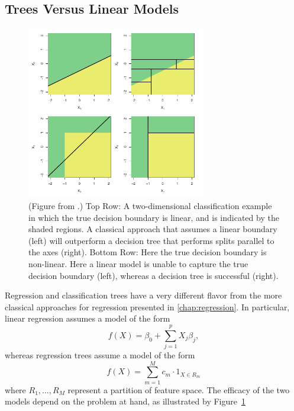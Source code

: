 \subsection{Trees Versus Linear Models} %
\label{sub:trees_versus_linear_models}
\begin{figure}[h!tb]
    \begin{center}
        \includegraphics[width=0.7\textwidth]{figures/decision_tree_linear_model}
    \end{center}
    \caption{(Figure from \cite{james2013statisticallearning}.)
Top Row: A two-dimensional classification example in which the true decision
boundary is linear, and is indicated by the shaded regions. A classical approach
that assumes a linear boundary (left) will outperform a decision tree that
performs splits parallel to the axes (right). Bottom Row: Here the true decision
boundary is non-linear. Here a linear model is unable to capture the true
decision boundary (left), whereas a decision tree is successful (right).}
    \label{fig:decision_trees_linear_models}
\end{figure}

Regression and classification trees have a very different flavor from the more
classical approaches for regression presented in \ref{chap:regression}.
In particular, linear regression assumes a model of the form
$$
        f(X) = \beta_0 + \sum_{j=1}^{p} X_j \beta_j,
$$
whereas regression trees assume a model of the form
$$
        f(X) = \sum_{m=1}^{M} c_m \cdot 1_{X \in R_m}
$$
where $R_1, \ldots, R_M$ represent a partition of feature space.
The efficacy of the two models depend on the problem at hand, as illustrated by
Figure~\ref{fig:decision_trees_linear_models}

